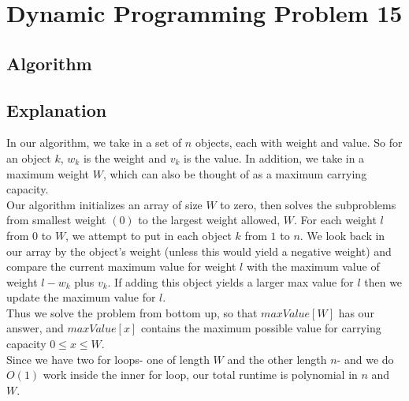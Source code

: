 \documentclass[12pt]{article}
\begin{document}
\section*{Dynamic Programming Problem 15}
	\subsection*{Algorithm}
\begin{algorithmic}
	\ENDFOR
			\ENDIF
		\ENDFOR
	\ENDFOR
\end{algorithmic}

	\subsection*{Explanation}
In our algorithm, we take in a set of $n$ objects, each with weight and value. So for an object $k$, $w_k$ is the weight and $v_k$ is the value. In addition, we take in a maximum weight $W$, which can also be thought of as a maximum carrying capacity.\\
Our algorithm initializes an array of size $W$ to zero, then solves the subproblems from smallest weight $(0)$ to the largest weight allowed, $W$. For each weight $l$ from $0$ to $W$, we attempt to put in each object $k$ from $1$ to $n$. We look back in our array by the object's weight (unless this would yield a negative weight) and compare the current maximum value for weight $l$ with the maximum value of weight $l - w_k$ plus $v_k$. If adding this object yields a larger max value for $l$ then we update the maximum value for $l$.\\
Thus we solve the problem from bottom up, so that $maxValue[W]$ has our answer, and $maxValue[x]$ contains the maximum possible value for carrying capacity $0 \le x \le W$.\\	
Since we have two for loops- one of length $W$ and the other length $n$- and we do $O(1)$ work inside the inner for loop, our total runtime is polynomial in $n$ and $W$.
\end{document}
